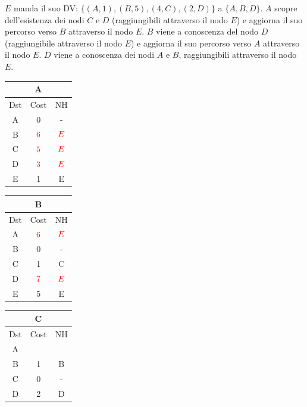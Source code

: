 \documentclass[10pt]{article}
\begin{document}
	\newline \newline \newline \newline
	$E$ manda il suo DV: $\{(A,1),(B,5),(4,C),(2,D)\}$ a $\{A,B,D\}$.
	\newline
	$A$ scopre dell'esistenza dei nodi $C$ e $D$ (raggiungibili attraverso il nodo $E$) e aggiorna il suo percorso verso $B$ attraverso il nodo $E$.
	\newline
	$B$ viene a conoscenza del nodo $D$ (raggiungibile attraverso il nodo $E$) e aggiorna il suo percorso verso $A$ attraverso il nodo $E$.
	\newline
	$D$ viene a conoscenza dei nodi $A$ e $B$, raggiungibili attraverso il nodo $E$.
	\begin{table}[h!]
		\begin{tabular}{|c||c||c|}
 			\hline
	 		\multicolumn{3}{|c|}{A} \\
 			\hline
 			Dst & Cost & NH\\
 			\hline
 			A & 0 & - \\
 			B & $\color{red} 6$  & $\color{red} E$ \\
 			C & $\color{red} 5$  & $\color{red} E$  \\
 			D & $\color{red} 3$  & $\color{red} E$ \\
 			E & 1 & E \\
 			\hline
		\end{tabular}
		\begin{tabular}{|c||c||c|}
 			\hline
	 		\multicolumn{3}{|c|}{B} \\
 			\hline
 			Dst & Cost & NH\\
 			\hline
 			A & $\color{red} 6$  & $\color{red} E$ \\
 			B & 0 & - \\
 			C & 1 & C  \\
 			D & $\color{red} 7$  & $\color{red} E$ \\
 			E & 5 & E \\
 			\hline
		\end{tabular}
		\begin{tabular}{|c||c||c|}
 			\hline
	 		\multicolumn{3}{|c|}{C} \\
 			\hline
 			Dst & Cost & NH\\
 			\hline
 			A &   &   \\
 			B & 1 & B \\
 			C & 0 & - \\
 			D & 2 & D \\

\end{tabular}
\end{table}
\end{document}
